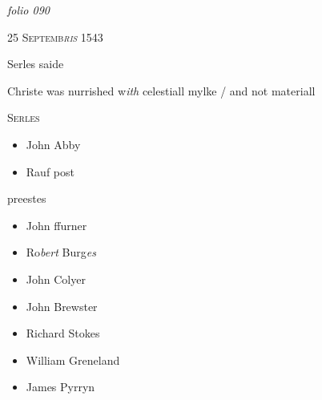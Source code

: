 \documentclass[12pt, a4paper]{book}
\begin{document}
            
\dotfill
					

\textit{folio 090}


            
               
				\begin{center} \begin{large} {\scshape 
               	25 Septemb\textit{ris} 1543
               } \end{large} \end{center}
			

 
 	
			
 	
		\ifthenelse{\isodd{\thepage}}
		{\reversemarginpar}
		{\normalmarginpar}
		Serles
			 saide
 	
		\ifthenelse{\isodd{\thepage}}
		{\reversemarginpar}
		{\normalmarginpar}
		Christe was nurrished w\textit{ith} celestiall mylke / and
            	not materiall
            
 

                  
				\begin{center}  {\scshape Serles}  \end{center}
			
 
 	
 	
 	
 		\begin{itemize}
 			\item[]John Abby
 			\item[]Rauf post
 		\end{itemize}
 		
 			
 			preestes
 		
 		\begin{itemize}
 			\item[]John ffurner
 			\item[]Ro\textit{bert} Burg\textit{es}
 			\item[]John Colyer
 			\item[]John Brewster
 			\item[]Richard Stokes
 			\item[]William Greneland
 			\item[]James Pyrryn
 		\end{itemize}
 			
\end{document}
